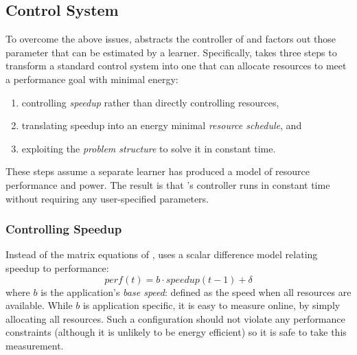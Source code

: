 \subsection{\SYSTEM{} Control System}
To overcome the above issues, \SYSTEM{} abstracts the controller of
 and factors out those parameter that can be
estimated by a learner.  Specifically, \SYSTEM{} takes three steps to
transform a standard control system into one that can allocate
resources to meet a performance goal with minimal energy: 
\begin{enumerate}
\item controlling \emph{speedup} rather than directly controlling
  resources,
\item translating speedup into an energy
  minimal \emph{resource schedule}, and  
\item exploiting the \emph{problem structure} to solve it in constant
  time.  
\end{enumerate}
These steps assume a separate learner has produced a model of resource
performance and power.  The result is that \SYSTEM{}'s controller runs
in constant time without requiring any user-specified parameters.



\subsubsection{Controlling Speedup}
Instead of the matrix equations of , \SYSTEM{}
uses a scalar difference model relating speedup to performance:
\begin{equation}
  perf(t) = b \cdot speedup(t-1) + \delta \label{eqn:speedup}
\end{equation}
where $b$ is the application's \emph{base speed}: defined as the speed
when all resources are available.  While $b$ is application specific,
it is easy to measure online, by simply allocating all resources. Such
a configuration should not violate any performance constraints
(although it is unlikely to be energy efficient) so it is safe to take
this measurement.

